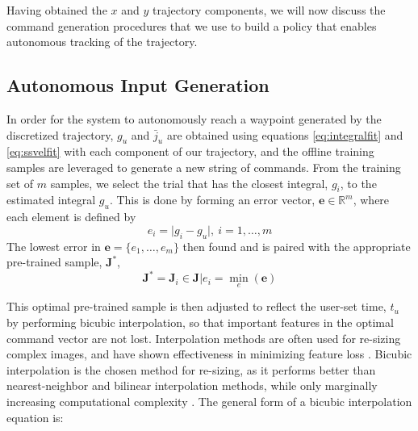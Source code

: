 \documentclass[letterpaper, 10 pt, conference]{ieeeconf}  %
\newcommand\NB[1]{$\spadesuit$\footnote{NB: #1}}
\newcommand{\R}{\mathbb{R}}
\begin{document}
Having obtained the $x$ and $y$ trajectory components, we will now discuss the command generation procedures that we use to build a policy that enables autonomous tracking of the trajectory.



\subsection{Autonomous Input Generation} \label{sec:generate}

In order for the system to autonomously reach a waypoint generated by the discretized trajectory, %
$g_u$ and $\bar{j}_u$ are obtained using equations \eqref{eq:integralfit} and \eqref{eq:ssvelfit} with each component of our trajectory, and the offline training samples are leveraged to generate a new string of commands. From the training set of $m$ samples, we select the trial that has the closest integral, $g_i$, to the estimated integral $g_u$. This is done by forming an error vector, $\bm{e}\in\R^{m}$, where each element is defined by
\begin{equation}
 e_i = \vert g_i-g_u \vert , ~i= 1,\ldots,m
\end{equation}
 The lowest error in $\bm{e} = \{e_1,\ldots,e_m\}$ then found and is paired with the appropriate pre-trained sample, $\bm{J}^*$, %
\begin{equation}
\bm{J}^* = \bm{J}_i \in \bm{J}\vert e_i = \min_e(\bm{e})
\end{equation}

This optimal pre-trained sample is then adjusted to reflect the user-set time, $t_u$ by performing bicubic interpolation, so that important features in the optimal command vector are not lost. Interpolation methods are often used for re-sizing complex images, and have shown effectiveness in minimizing feature loss \cite{bicfeatures}. Bicubic interpolation is the chosen method for re-sizing, as it performs better than nearest-neighbor and bilinear interpolation methods, while only marginally increasing computational complexity \cite{biccomp}. The general form of a bicubic interpolation equation is: 
\end{document}
